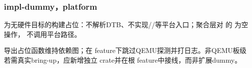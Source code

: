 
\subsubsection{impl-dummy，platform}

为无硬件目标的构建占位：不解析DTB、不实现//等平台入口；聚合层对  的  为空操作， 不调用平台路径。

导出占位函数维持依赖图；在 feature下跳过QEMU探测并打日志。非QEMU板级若需真实bring-up，应新增独立 crate并在根 feature中接线，而非扩展dummy。
